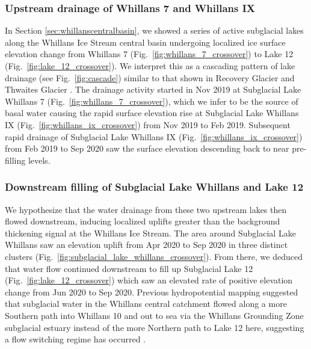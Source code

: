 \subsubsection{Upstream drainage of Whillans 7 and Whillans IX}

In Section \ref{sec:whillanscentralbasin}, we showed a series of active subglacial lakes along the Whillans Ice Stream central basin undergoing localized ice surface elevation change from Whillans 7 (Fig.~\ref{fig:whillans_7_crossover}) to Lake 12 (Fig.~\ref{fig:lake_12_crossover}).
We interpret this as a cascading pattern of lake drainage (see Fig.~\ref{fig:cascade}) similar to that shown in Recovery Glacier \citep{DowDynamicsActiveSubglacial2018} and Thwaites Glacier \citep{SmithConnectedsubglaciallake2017}. %
The drainage activity started in Nov 2019 at Subglacial Lake Whillans 7 (Fig.~\ref{fig:whillans_7_crossover}), which we infer to be the source of basal water causing the rapid surface elevation rise at Subglacial Lake Whillans IX (Fig.~\ref{fig:whillans_ix_crossover}) from Nov 2019 to Feb 2019.
Subsequent rapid drainage of Subglacial Lake Whillans IX (Fig.~\ref{fig:whillans_ix_crossover}) from Feb 2019 to Sep 2020 saw the surface elevation descending back to near pre-filling levels.

\subsubsection{Downstream filling of Subglacial Lake Whillans and Lake 12}

We hypothesize that the water drainage from these two upstream lakes then flowed downstream, inducing localized uplifts greater than the background thickening signal at the Whillans Ice Stream.
The area around Subglacial Lake Whillans \citep{TulaczykWISSARDSubglacialLake2014} saw an elevation uplift from Apr 2020 to Sep 2020 in three distinct clusters (Fig.~\ref{fig:subglacial_lake_whillans_crossover}).
From there, we deduced that water flow continued downstream to fill up Subglacial Lake 12 (Fig.~\ref{fig:lake_12_crossover}) which saw an elevated rate of positive elevation change from Jun 2020 to Sep 2020.
Previous hydropotential mapping suggested that subglacial water in the Whillans central catchment flowed along a more Southern path into Whillans 10 \citep{SiegfriedEpisodicicevelocity2016} and out to sea via the Whillans Grounding Zone subglacial estuary \citep[see][]{HorganSubglacialLakeWhillans2012,VenturelliMidHoloceneGrounding2020} instead of the more Northern path to Lake 12 here, suggesting a flow switching regime has occurred \citep[c.f.][]{CarterEvidencerapidsubglacial2013}.

